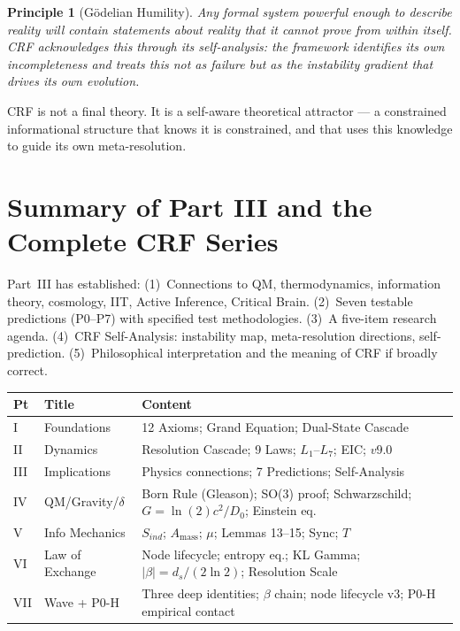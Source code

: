 \documentclass[12pt, a4paper]{article}
\newtheorem{principle}{Principle}[section]
\begin{document}
\begin{principle}[G\"{o}delian Humility]
Any formal system powerful enough to describe reality will contain statements about reality
that it cannot prove from within itself. CRF acknowledges this through its self-analysis:
the framework identifies its own incompleteness and treats this not as failure but as the
instability gradient that drives its own evolution.
\end{principle}

CRF is not a final theory. It is a self-aware theoretical attractor --- a constrained
informational structure that knows it is constrained, and that uses this knowledge to guide
its own meta-resolution.

\section{Summary of Part III and the Complete CRF Series}

Part~III has established: (1)~Connections to QM, thermodynamics, information theory,
cosmology, IIT, Active Inference, Critical Brain. (2)~Seven testable predictions (P0--P7)
with specified test methodologies. (3)~A five-item research agenda. (4)~CRF Self-Analysis:
instability map, meta-resolution directions, self-prediction. (5)~Philosophical interpretation
and the meaning of CRF if broadly correct.

\begin{center}
\renewcommand{\arraystretch}{1.2}
\begin{tabular}{p{0.6cm} p{2.8cm} p{9cm}}
\toprule
\textbf{Pt} & \textbf{Title} & \textbf{Content} \\
\midrule
I   & Foundations        & 12 Axioms; Grand Equation; Dual-State Cascade \\
II  & Dynamics           & Resolution Cascade; 9 Laws; $L_1$--$L_7$; EIC; $v9.0$ \\
III & Implications       & Physics connections; 7 Predictions; Self-Analysis \\
IV  & QM/Gravity/$\delta$ & Born Rule (Gleason); SO(3) proof; Schwarzschild; $G = \ln(2)c^2/D_0$; Einstein eq. \\
V   & Info Mechanics     & $S_{ind}$; $A_{\mathrm{mass}}$; $\mu$; Lemmas 13--15; Sync; $T$ \\
VI  & Law of Exchange    & Node lifecycle; entropy eq.; KL Gamma; $|\beta| = d_s/(2\ln 2)$; Resolution Scale \\
VII & Wave + P0-H        & Three deep identities; $\beta$ chain; node lifecycle v3; P0-H empirical contact \\
\bottomrule
\end{tabular}
\end{center}
\end{document}
